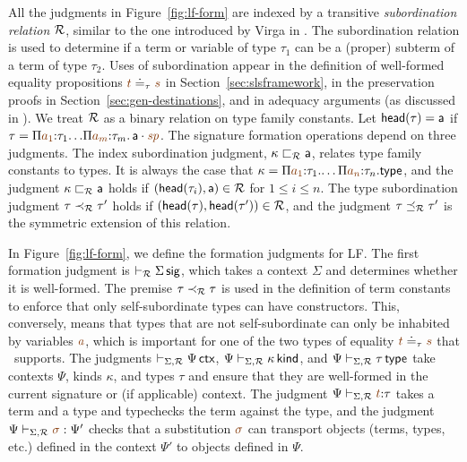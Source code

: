 All the judgments in Figure~\ref{fig:lf-form} are indexed by a
transitive {\it subordination relation} $\mathcal R$, similar to the one
introduced by Virga in \cite{virga99higherorder}. The subordination
relation is used to determine if a term or variable of type $\tau_1$ can
be a (proper) subterm of a term of type $\tau_2$. Uses of
subordination appear in the definition of well-formed equality
propositions $\lf t \doteq_\tau \lf s$ in
Section~\ref{sec:slsframework}, in the preservation proofs in
Section~\ref{sec:gen-destinations}, and in adequacy arguments (as
discussed in \cite{harper07mechanizing}). We treat $\mathcal R$ as a
binary relation on type family constants.  Let ${\sf head}(\tau) =
{\sf a}$ if $\tau =
\lfpi{a_1}{\tau_{1}}{\,.\,.\lfpi{a_{m}}{\tau_{m}}{\,\lfroot{\sf
      a}{\spi}}}$. The signature formation operations depend on three
judgments. The index subordination judgment, $\kappa \sqsubset_\mathcal R
{\sf a}$, relates type family constants to types.
%
It is always the case that $\kappa =
\lfpi{a_1}{\tau_1}{\ldots\lfpi{a_n}{\tau_n}{\sf type}}$, and the
judgment $\kappa \sqsubset_\mathcal R {\sf a}$ holds if $({\sf
  head}(\tau_i), {\sf a}) \in \mathcal R$ for $1 \leq i \leq n$.
%
The type subordination judgment $\tau \prec_\mathcal R \tau'$ holds if
$({\sf head}(\tau), {\sf head}(\tau')) \in \mathcal R$, and the judgment
$\tau \preceq_\mathcal R \tau'$ is the symmetric extension of this
relation.

In Figure~\ref{fig:lf-form}, we define the formation judgments 
for LF. The first formation judgment is $\vdash_\mathcal R
\Sigma\,{\sf sig}$, which takes a context $\Sigma$ and determines
whether it is well-formed.  The premise $\tau \prec_\mathcal R \tau$ is
used in the definition of term constants to enforce that only
self-subordinate types can have constructors. This, conversely, means
that types that are not self-subordinate can only be inhabited by
variables $\lf{a}$, which is important for one of the two types of
equality $\lf{t} \doteq_\tau \lf{s}$ that \sls~supports. The judgments
$\vdash_{\Sigma,\mathcal R} \Psi\,{\sf ctx}$, $\Psi
\vdash_{\Sigma,\mathcal R} \kappa\,{\sf kind}$, and $\Psi
\vdash_{\Sigma,\mathcal R} \tau\,{\sf type}$ take contexts
$\Psi$, kinds $\kappa$, and types $\tau$ and ensure that they are
well-formed in the current signature or (if applicable) context.  The
judgment $\Psi \vdash_{\Sigma,\subord} \lf{t}{:} \tau$ takes a term
and a type and typechecks the term against the type, and the judgment
$\Psi \vdash_{\Sigma,\subord} \lf{\sigma} : \Psi'$ checks that a
substitution $\lf{\sigma}$ can transport objects (terms, types, etc.)
defined in the context $\Psi'$ to objects defined in $\Psi$.


